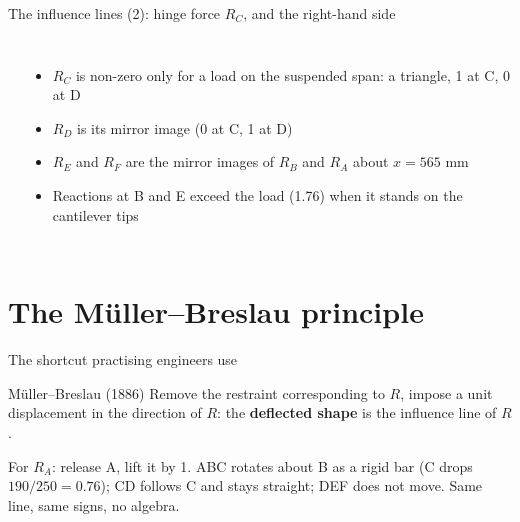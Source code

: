 \documentclass[aspectratio=169,11pt]{beamer}
\renewcommand{\ILscale}{0.0100}
\begin{document}
\begin{frame}{The influence lines (2): hinge force $R_C$, and the right-hand side}
\begin{columns}[T]
\renewcommand{\ILyscale}{0.72}\renewcommand{\ILscale}{0.0055}
\\[4pt]
\begin{itemize}
  \item $R_C$ is non-zero only for a load on the suspended span: a triangle, 1 at C, 0 at D
  \item $R_D$ is its mirror image (0 at C, 1 at D)
  \item $R_E$ and $R_F$ are the mirror images of $R_B$ and $R_A$ about $x = 565$ mm
  \item Reactions at B and E exceed the load (1.76) when it stands on the cantilever tips
\end{itemize}
\end{columns}
\end{frame}

\section{The Müller--Breslau principle}
\begin{frame}{The shortcut practising engineers use}
\begin{block}{Müller--Breslau (1886)}
Remove the restraint corresponding to $R$, impose a unit displacement in the direction of $R$: the \textbf{deflected shape} is the influence line of $R$.
\end{block}
\begin{center}
\end{center}
For $R_A$: release A, lift it by 1. ABC rotates about B as a rigid bar (C drops $190/250 = 0.76$); CD follows C and stays straight; DEF does not move. \alert{Same line, same signs}, no algebra.
\end{frame}
\end{document}
